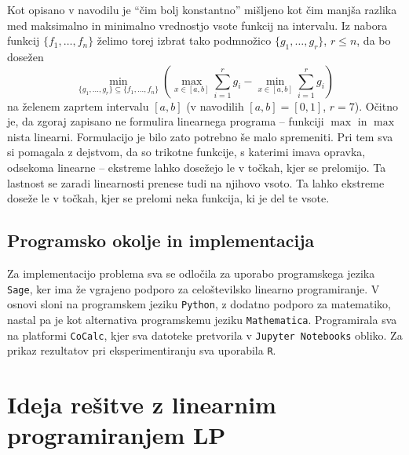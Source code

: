 \documentclass[11pt]{article}
\theoremstyle{definition}
\newcommand{\1}{\mathbbm{1}}
\newcommand{\set}[1]{\{#1\}}
\begin{document}
Kot opisano v navodilu je ``čim bolj konstantno'' mišljeno kot čim manjša razlika med maksimalno in minimalno vrednostjo vsote funkcij na intervalu. Iz nabora funkcij $\set{f_1,\ldots,f_n}$ želimo torej izbrat tako podmnožico $\set{g_1,\ldots,g_r}$, $r \leq n$, da bo dosežen
$$\min_{\set{g_1,\ldots,g_r} \subseteq \set{f_1,\ldots,f_n}}\left({\max_{x \in [a,b]}\sum_{i=1}^r g_i - \min_{x \in [a,b]}\sum_{i=1}^r g_i}\right)$$
na želenem zaprtem intervalu $[a,b]$ (v navodilih $[a,b]=[0,1]$, $r=7$). Očitno je, da zgoraj zapisano ne formulira linearnega programa -- funkciji $\max$ in $\max$ nista linearni. Formulacijo je bilo zato potrebno še malo spremeniti. Pri tem sva si pomagala z dejstvom, da so trikotne funkcije, s katerimi imava opravka, odsekoma linearne -- ekstreme lahko dosežejo le v točkah, kjer se prelomijo. Ta lastnost se zaradi linearnosti prenese tudi na njihovo vsoto. Ta lahko ekstreme doseže le v točkah, kjer se prelomi neka funkcija, ki je del te vsote. 


\subsection{Programsko okolje in implementacija}
\vspace{0.5cm}

Za implementacijo problema sva se odločila za uporabo programskega jezika \texttt{Sage}, ker ima že vgrajeno podporo za celoštevilsko linearno programiranje. V osnovi sloni na programskem jeziku \texttt{Python}, z dodatno podporo za matematiko, nastal pa je kot alternativa programskemu jeziku \texttt{Mathematica}. Programirala sva na platformi \texttt{CoCalc}, kjer sva datoteke pretvorila v \texttt{Jupyter Notebooks} obliko. Za prikaz rezultatov pri eksperimentiranju sva uporabila \texttt{R}.


\section{Ideja rešitve z linearnim programiranjem LP}
\vspace{0.5cm}
\end{document}
